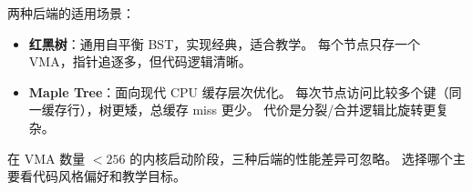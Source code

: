 \begin{designbox}
两种后端的适用场景：
\begin{itemize}
  \item \textbf{红黑树}：通用自平衡 BST，实现经典，适合教学。
        每个节点只存一个 VMA，指针追逐多，但代码逻辑清晰。
  \item \textbf{Maple Tree}：面向现代 CPU 缓存层次优化。
        每次节点访问比较多个键（同一缓存行），树更矮，总缓存 miss 更少。
        代价是分裂/合并逻辑比旋转更复杂。
\end{itemize}
在 VMA 数量 $< 256$ 的内核启动阶段，三种后端的性能差异可忽略。
选择哪个主要看代码风格偏好和教学目标。
\end{designbox}


